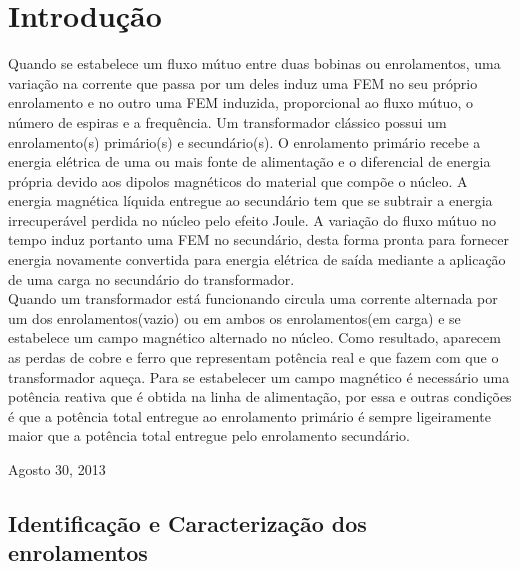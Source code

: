 \documentclass[conference]{IEEEtran}
\begin{document}




%
\IEEEpeerreviewmaketitle



\section{Introdução}

Quando se estabelece um fluxo mútuo entre duas bobinas ou enrolamentos, uma
variação na corrente que passa por um deles induz uma FEM no seu próprio
enrolamento e no outro uma FEM induzida, proporcional ao fluxo mútuo, o 
número de espiras e a frequência. Um transformador clássico possui
um enrolamento(s) primário(s) e secundário(s). O enrolamento primário recebe
a energia elétrica de uma ou mais fonte de alimentação e o diferencial
de energia própria devido aos dipolos magnéticos do material que compõe o
núcleo. A energia magnética líquida entregue ao secundário tem que se 
subtrair a energia irrecuperável perdida no núcleo pelo efeito Joule.
A variação do fluxo mútuo no tempo induz portanto uma FEM no secundário, 
desta forma pronta para fornecer energia novamente convertida para energia
elétrica de saída mediante a aplicação de uma carga no secundário do 
transformador.\\
Quando um transformador está funcionando circula uma corrente alternada
por um dos enrolamentos(vazio) ou em ambos os enrolamentos(em carga) e 
se estabelece um campo magnético alternado no núcleo. Como resultado,
aparecem as perdas de cobre e ferro que representam potência real e que fazem
com que o transformador aqueça. Para se estabelecer um campo magnético
é necessário uma potência reativa que é obtida na linha de alimentação,
por essa e outras condições é que a potência total entregue ao enrolamento
primário é sempre ligeiramente maior que a potência total entregue pelo
enrolamento secundário.

 
\hfill Agosto 30, 2013

\subsection{Identificação e Caracterização dos enrolamentos}
\end{document}
